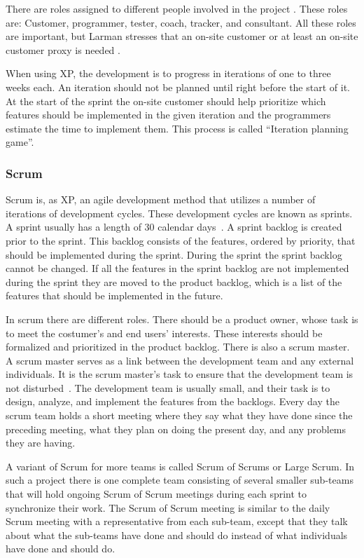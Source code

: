 There are roles assigned to different people involved in the project \cite[p.~145]{Larman04}.
These roles are: Customer, programmer, tester, coach, tracker, and consultant.
All these roles are important, but Larman stresses that an on-site customer or at least an on-site customer proxy is needed \cite[p.~152-156]{Larman04}.

When using XP, the development is to progress in iterations of one to three weeks each.
An iteration should not be planned until right before the start of it.
At the start of the sprint the on-site customer should help prioritize which features should be implemented in the given iteration and the programmers estimate the time to implement them.
This process is called ``Iteration planning game''.

\subsubsection{Scrum}
\label{par:scrum}
Scrum is, as XP, an agile development method that utilizes a number of iterations of development cycles.
These development cycles are known as sprints.
A sprint usually has a length of 30 calendar days~\cite{Larman04}.
A sprint backlog is created prior to the sprint. 
This backlog consists of the features, ordered by priority, that should be implemented during the sprint.
During the sprint the sprint backlog cannot be changed.
If all the features in the sprint backlog are not implemented during the sprint they are moved to the product backlog, which is a list of the features that should be implemented in the future.

In scrum there are different roles. 
There should be a product owner, whose task is to meet the costumer's and end users' interests. 
These interests should be formalized and prioritized in the product backlog.
There is also a scrum master. 
A scrum master serves as a link between the development team and any external individuals.
It is the scrum master's task to ensure that the development team is not disturbed~\cite{Larman04}.
The development team is usually small, and their task is to design, analyze, and implement the features from the backlogs.
Every day the scrum team holds a short meeting where they say what they have done since the preceding meeting, what they plan on doing the present day, and any problems they are having.

A variant of Scrum for more teams is called Scrum of Scrums or Large Scrum.
In such a project there is one complete team consisting of several smaller sub-teams that will hold ongoing Scrum of Scrum meetings during each sprint to synchronize their work.
The Scrum of Scrum meeting is similar to the daily Scrum meeting with a representative from each sub-team, except that they talk about what the sub-teams have done and should do instead of what individuals have done and should do.

